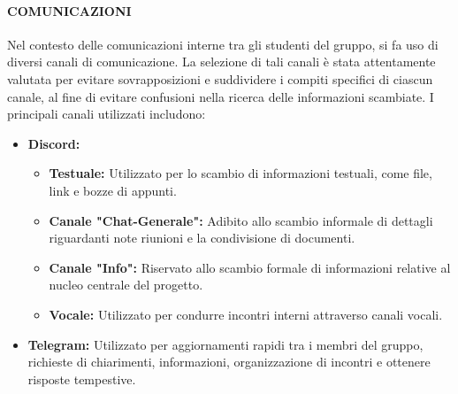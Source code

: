 \documentclass{article}
\begin{document}
\paragraph{COMUNICAZIONI}
Nel contesto delle comunicazioni interne tra gli studenti del gruppo, si fa uso di diversi canali di comunicazione. La selezione di tali canali è stata attentamente valutata per evitare sovrapposizioni e suddividere i compiti specifici di ciascun canale, al fine di evitare confusioni nella ricerca delle informazioni scambiate. I principali canali utilizzati includono:
\begin{itemize}
    \item \textbf{Discord:}
        \begin{itemize}
            \item \textbf{Testuale:} Utilizzato per lo scambio di informazioni testuali, come file, link e bozze di appunti.
            \item \textbf{Canale "Chat-Generale":} Adibito allo scambio informale di dettagli riguardanti note riunioni e la condivisione di documenti.
            \item \textbf{Canale "Info":} Riservato allo scambio formale di informazioni relative al nucleo centrale del progetto.
            \item \textbf{Vocale: }Utilizzato per condurre incontri interni attraverso canali vocali.
        \end{itemize}
    \item \textbf{Telegram:}
Utilizzato per aggiornamenti rapidi tra i membri del gruppo, richieste di chiarimenti, informazioni, organizzazione di incontri e ottenere risposte tempestive.

\end{itemize}
\end{document}
